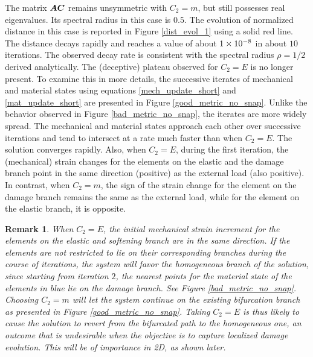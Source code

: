 \documentclass[10pt,review]{cas-sc}
\newtheorem*{remark}{Remark}
\begin{document}
The matrix $\mbox{\boldmath $A$}  \mbox{\boldmath $C$} $ remains unsymmetric with $C_2=m$, but still possesses real eigenvalues. Its spectral radius in this case is $0.5$. The evolution of normalized distance in this case is reported in Figure \ref{dist_evol_1} using a solid red line. The distance decays rapidly and reaches a value of about $\SI{1E-8}{}$ in about $10$ iterations. The observed decay rate is consistent with the spectral radius $\rho = 1/2$ derived analytically. The (deceptive) plateau observed for $C_2=E$ is no longer present. To examine this in more details, the successive iterates of mechanical and material states using equations \eqref{mech_update_short} and \eqref{mat_update_short} are presented in Figure \ref{good_metric_no_snap}. Unlike the behavior observed in Figure \ref{bad_metric_no_snap}, the iterates are more widely spread. The mechanical and material states approach each other over successive iterations and tend to intersect at a rate much faster than when $C_2=E$. The solution converges rapidly. Also, when $C_2=E$, during the first iteration, the (mechanical) strain changes for the elements on the elastic and the damage branch point in the same direction (positive) as the external load (also positive). In contrast, when $C_2=m$, the sign of the strain change for the element on the damage branch remains the same as the external load, while for the element on the elastic branch, it is opposite. 

\begin{remark}
	When $C_2 = E$, the initial mechanical strain increment for the elements on the elastic and softening branch are in the same direction. If the elements are not restricted to lie on their corresponding branches during the course of iterations, the system will  favor the homogeneous branch of the solution, since starting from iteration $2$, the nearest points for the material state of the elements in blue lie on the damage branch. See Figure \ref{bad_metric_no_snap}. Choosing $C_2=m$ will let the system continue on the existing bifurcation branch as presented in Figure \ref{good_metric_no_snap}. Taking $C_2 = E$ is thus likely to cause the solution to revert from the bifurcated path to the homogeneous one, an outcome that is undesirable when the objective is to capture localized damage evolution. This will be of importance in 2D, as shown later.
\end{remark}
\end{document}

